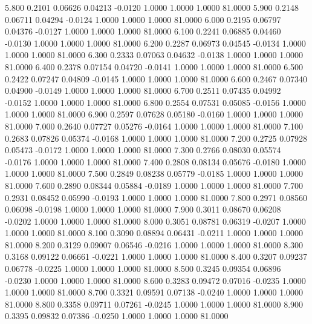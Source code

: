    5.800   0.2101   0.06626   0.04213  -0.0120   1.0000   1.0000   1.0000  81.0000
   5.900   0.2148   0.06711   0.04294  -0.0124   1.0000   1.0000   1.0000  81.0000
   6.000   0.2195   0.06797   0.04376  -0.0127   1.0000   1.0000   1.0000  81.0000
   6.100   0.2241   0.06885   0.04460  -0.0130   1.0000   1.0000   1.0000  81.0000
   6.200   0.2287   0.06973   0.04545  -0.0134   1.0000   1.0000   1.0000  81.0000
   6.300   0.2333   0.07063   0.04632  -0.0138   1.0000   1.0000   1.0000  81.0000
   6.400   0.2378   0.07154   0.04720  -0.0141   1.0000   1.0000   1.0000  81.0000
   6.500   0.2422   0.07247   0.04809  -0.0145   1.0000   1.0000   1.0000  81.0000
   6.600   0.2467   0.07340   0.04900  -0.0149   1.0000   1.0000   1.0000  81.0000
   6.700   0.2511   0.07435   0.04992  -0.0152   1.0000   1.0000   1.0000  81.0000
   6.800   0.2554   0.07531   0.05085  -0.0156   1.0000   1.0000   1.0000  81.0000
   6.900   0.2597   0.07628   0.05180  -0.0160   1.0000   1.0000   1.0000  81.0000
   7.000   0.2640   0.07727   0.05276  -0.0164   1.0000   1.0000   1.0000  81.0000
   7.100   0.2683   0.07826   0.05374  -0.0168   1.0000   1.0000   1.0000  81.0000
   7.200   0.2725   0.07928   0.05473  -0.0172   1.0000   1.0000   1.0000  81.0000
   7.300   0.2766   0.08030   0.05574  -0.0176   1.0000   1.0000   1.0000  81.0000
   7.400   0.2808   0.08134   0.05676  -0.0180   1.0000   1.0000   1.0000  81.0000
   7.500   0.2849   0.08238   0.05779  -0.0185   1.0000   1.0000   1.0000  81.0000
   7.600   0.2890   0.08344   0.05884  -0.0189   1.0000   1.0000   1.0000  81.0000
   7.700   0.2931   0.08452   0.05990  -0.0193   1.0000   1.0000   1.0000  81.0000
   7.800   0.2971   0.08560   0.06098  -0.0198   1.0000   1.0000   1.0000  81.0000
   7.900   0.3011   0.08670   0.06208  -0.0202   1.0000   1.0000   1.0000  81.0000
   8.000   0.3051   0.08781   0.06319  -0.0207   1.0000   1.0000   1.0000  81.0000
   8.100   0.3090   0.08894   0.06431  -0.0211   1.0000   1.0000   1.0000  81.0000
   8.200   0.3129   0.09007   0.06546  -0.0216   1.0000   1.0000   1.0000  81.0000
   8.300   0.3168   0.09122   0.06661  -0.0221   1.0000   1.0000   1.0000  81.0000
   8.400   0.3207   0.09237   0.06778  -0.0225   1.0000   1.0000   1.0000  81.0000
   8.500   0.3245   0.09354   0.06896  -0.0230   1.0000   1.0000   1.0000  81.0000
   8.600   0.3283   0.09472   0.07016  -0.0235   1.0000   1.0000   1.0000  81.0000
   8.700   0.3321   0.09591   0.07138  -0.0240   1.0000   1.0000   1.0000  81.0000
   8.800   0.3358   0.09711   0.07261  -0.0245   1.0000   1.0000   1.0000  81.0000
   8.900   0.3395   0.09832   0.07386  -0.0250   1.0000   1.0000   1.0000  81.0000
